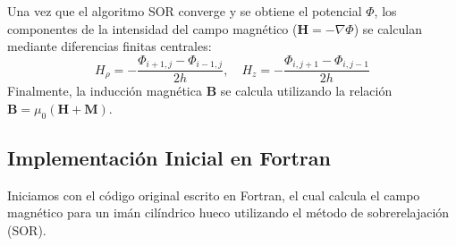 Una vez que el algoritmo SOR converge y se obtiene el potencial $\Phi$, los componentes de la intensidad del campo magnético ($\mathbf{H} = -\nabla\Phi$) se calculan mediante diferencias finitas centrales:
\begin{equation}
    H_\rho = -\frac{\Phi_{i+1,j} - \Phi_{i-1,j}}{2h}, \quad H_z = -\frac{\Phi_{i,j+1} - \Phi_{i,j-1}}{2h}
\end{equation}
Finalmente, la inducción magnética $\mathbf{B}$ se calcula utilizando la relación $\mathbf{B} = \mu_0 (\mathbf{H} + \mathbf{M})$.



\subsection{Implementación Inicial en Fortran}
Iniciamos con el código original escrito en Fortran, el cual calcula el campo magnético para un imán cilíndrico hueco utilizando el método de sobrerelajación (SOR).


